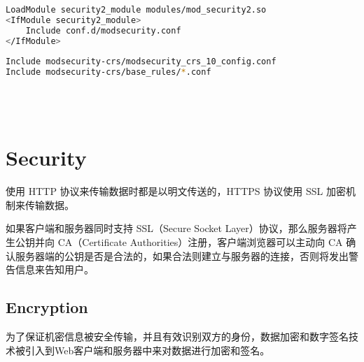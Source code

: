 \begin{lstlisting}[language=bash]
LoadModule security2_module modules/mod_security2.so
<IfModule security2_module>
    Include conf.d/modsecurity.conf
</IfModule>
 
Include modsecurity-crs/modsecurity_crs_10_config.conf
Include modsecurity-crs/base_rules/*.conf
\end{lstlisting}






\begin{lstlisting}[language=bash]

\end{lstlisting}




\begin{lstlisting}[language=bash]

\end{lstlisting}





\begin{lstlisting}[language=bash]

\end{lstlisting}




\begin{lstlisting}[language=bash]

\end{lstlisting}





\section{Security}



使用 HTTP 协议来传输数据时都是以明文传送的，HTTPS 协议使用 SSL 加密机制来传输数据。



如果客户端和服务器同时支持 SSL（Secure Socket Layer）协议，那么服务器将产生公钥并向 CA（Certificate Authorities）注册，客户端浏览器可以主动向 CA 确认服务器端的公钥是否是合法的，如果合法则建立与服务器的连接，否则将发出警告信息来告知用户。

\subsection{Encryption}

为了保证机密信息被安全传输，并且有效识别双方的身份，数据加密和数字签名技术被引入到Web客户端和服务器中来对数据进行加密和签名。

